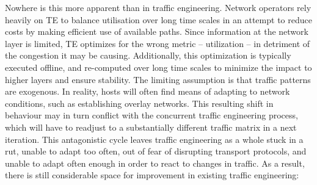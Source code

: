 Nowhere is this more apparent than in traffic engineering. 
Network operators rely heavily on \ac{TE} to balance utilisation over long time scales in an attempt to reduce costs by making efficient use of available paths. 
Since information at the network layer is limited, \ac{TE} optimizes for the wrong metric -- utilization -- in detriment of the congestion it may be causing. 
Additionally, this optimization is typically executed offline, and re-computed over long time scales to minimize the impact to higher layers and ensure stability. 
The limiting assumption is that traffic patterns are exogenous. 
In reality, hosts will often find means of adapting to network conditions, such as establishing overlay networks. 
This resulting shift in behaviour may in turn conflict with the concurrent traffic engineering process, which will have to readjust to a substantially different traffic matrix in a next iteration. 
This antagonistic cycle leaves traffic engineering as a whole stuck in a rut, unable to adapt too often, out of fear of disrupting transport protocols, and unable to adapt often enough in order to react to changes in traffic. 
As a result, there is still considerable space for improvement in existing traffic engineering:

